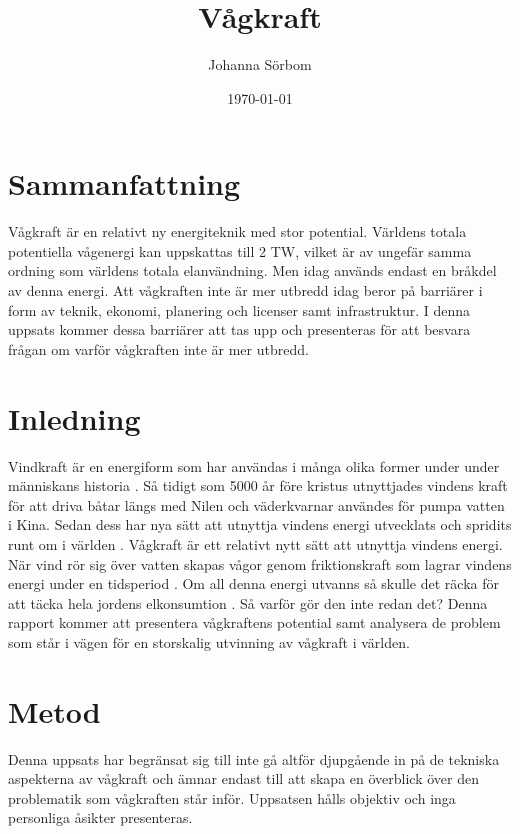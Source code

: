 \documentclass[10pt,a4paper,oneside]{article}
\newcommand{\titlepicture}[2][]{%
  \renewcommand\placetitlepicture{%
    \texttt{[image: \#2]}\par\medskip
  }%
}
\newcommand{\placetitlepicture}{}
\begin{document}
\title{Vågkraft \\ 
\large }
\author{\small Johanna Sörbom}
\date{\small \today}
\titlepicture[width=3in]{Wave}

\maketitle
\newpage

\section{Sammanfattning}
Vågkraft är en relativt ny energiteknik med stor potential. Världens totala potentiella vågenergi kan uppskattas till 2 TW, vilket är av ungefär samma ordning som världens totala elanvändning. Men idag används endast en bråkdel av denna energi. Att vågkraften inte är mer utbredd idag beror på barriärer i form av teknik, ekonomi, planering och licenser samt infrastruktur. I denna uppsats kommer dessa barriärer att tas upp och presenteras för att besvara frågan om varför vågkraften inte är mer utbredd.  \newpage

\tableofcontents
\newpage

\section{Inledning}
Vindkraft är en energiform som har användas i många olika former under under människans historia \cite{Elliott}. Så tidigt som 5000 år före kristus utnyttjades vindens kraft för att driva båtar längs med Nilen och väderkvarnar användes för pumpa vatten i Kina. Sedan dess har nya sätt att utnyttja vindens energi utvecklats och spridits runt om i världen \cite{WEF}. Vågkraft är ett relativt nytt sätt att utnyttja vindens energi. När vind rör sig över vatten skapas vågor genom friktionskraft som lagrar vindens energi under en tidsperiod \cite{Elliott}. Om all denna energi utvanns så skulle det räcka för att täcka hela jordens elkonsumtion \cite{Cruz}. Så varför gör den inte redan det? Denna rapport kommer att presentera vågkraftens potential samt analysera de problem som står i vägen för en storskalig utvinning av vågkraft i världen. 

\section{Metod}
Denna uppsats har begränsat sig till inte gå altför djupgående in på de tekniska aspekterna av vågkraft och ämnar endast till att skapa en överblick över den problematik som vågkraften står inför. Uppsatsen hålls objektiv och inga personliga åsikter presenteras. 
\end{document}
